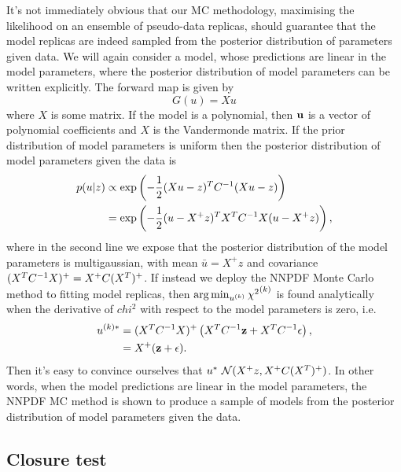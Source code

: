 It's not immediately obvious that our
MC methodology, maximising the likelihood on an ensemble of pseudo-data replicas,
should guarantee that the model replicas are indeed sampled from the posterior
distribution of parameters given data. We will again consider a model, whose
predictions are linear in the model parameters,
where the posterior distribution of model parameters can be written explicitly.
The forward map is given by
\begin{equation}
    G(u) = X u
\end{equation}
where $X$ is some matrix. If the model is a polynomial, then $\mathbf{u}$ is
a vector of polynomial coefficients and $X$ is the Vandermonde matrix. If
the prior distribution of model parameters is uniform then the posterior
distribution of model parameters given the data is
\begin{equation}
    \begin{split}
        p(u | z) &\propto
        \exp \left( -\frac{1}{2} (Xu - z)^T C^{-1}_{} (Xu - z)\right) \\
        &= \exp \left( -\frac{1}{2} (u - X^+z)^T X^TC^{-1}_{}X (u - X^+z)\right),
    \end{split}
\end{equation}
where in the second line we expose that the posterior distribution of the model
parameters is multigaussian, with mean $\bar{u} = X^+z$ and covariance
$(X^TC^{-1}_{}X)^+ = X^+ C (X^T)^+$. If instead we deploy the NNPDF Monte Carlo method to fitting
model replicas, then $\arg\min_{u^{(k)}} {\chi^2}^{(k)}$ is found analytically
when the derivative of $chi^2$ with respect to the model parameters is zero, i.e.
\begin{equation}
    \begin{split}
        u^{(k) *} &= (X^TC^{-1}_{}X)^{+}
        \left( X^T C^{-1}_{} \mathbf{z} + X^T C^{-1}_{} \mathbf{\epsilon} \right), \\
        &= X^+ (\mathbf{z} + \mathbf{\epsilon}).
    \end{split}
\end{equation}
Then it's easy to convince ourselves that
$u^{*} ~ \mathcal{N}( X^+z, X^+ C (X^T)^+)$. In other words, when the
model predictions are linear in the model parameters, the NNPDF MC method is
shown to produce a sample of models from the posterior distribution of
model parameters given the data. %

\subsection{Closure test}

